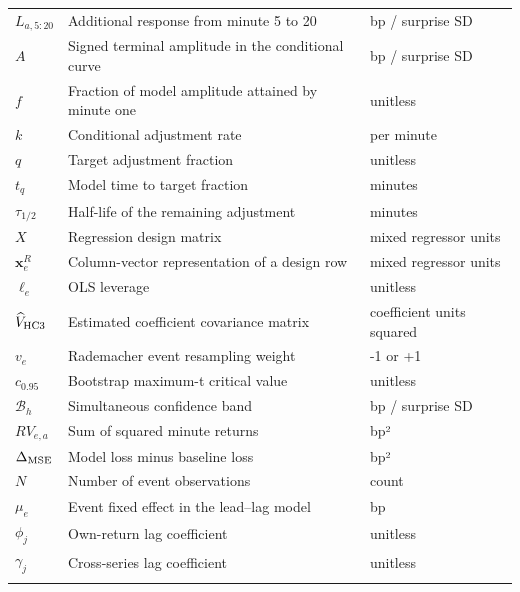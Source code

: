 {\begin{longtable}{@{}L{26mm}L{92mm}L{38.5mm}@{}}
$L_{a,5:20}$ & Additional response from minute 5 to 20 & bp / surprise SD \\ \hline
$A$ & Signed terminal amplitude in the conditional curve & bp / surprise SD \\ \hline
$f$ & Fraction of model amplitude attained by minute one & unitless \\ \hline
$k$ & Conditional adjustment rate & per minute \\ \hline
$q$ & Target adjustment fraction & unitless \\ \hline
$t_q$ & Model time to target fraction & minutes \\ \hline
$\tau_{1/2}$ & Half-life of the remaining adjustment & minutes \\ \hline
$X$ & Regression design matrix & mixed regressor units \\ \hline
$\mathbf{x}^{R}_e$ & Column-vector representation of a design row & mixed regressor units \\ \hline
$\ell_e$ & OLS leverage & unitless \\ \hline
$\widehat V_{\rm HC3}$ & Estimated coefficient covariance matrix & coefficient units squared \\ \hline
$v_e$ & Rademacher event resampling weight & -1 or +1 \\ \hline
$c_{0.95}$ & Bootstrap maximum-t critical value & unitless \\ \hline
$\mathcal B_h$ & Simultaneous confidence band & bp / surprise SD \\ \hline
$RV_{e,a}$ & Sum of squared minute returns & bp² \\ \hline
$\Delta_{\rm MSE}$ & Model loss minus baseline loss & bp² \\ \hline
$N$ & Number of event observations & count \\ \hline
$\mu_e$ & Event fixed effect in the lead–lag model & bp \\ \hline
$\phi_j$ & Own-return lag coefficient & unitless \\ \hline
$\gamma_j$ & Cross-series lag coefficient & unitless \\ \hline

\end{longtable}}
